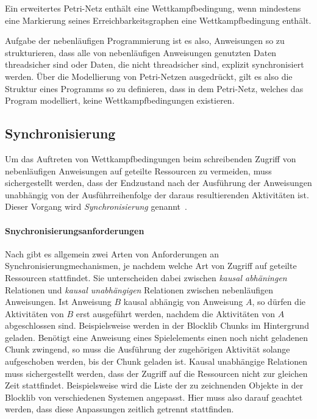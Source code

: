Ein erweitertes Petri-Netz enthält eine Wettkampfbedingung, wenn mindestens eine Markierung seines Erreichbarkeitsgraphen eine Wettkampfbedingung enthält.

Aufgabe der nebenläufigen Programmierung ist es also, Anweisungen so zu strukturieren, dass alle von nebenläufigen Anweisungen genutzten Daten threadsicher sind oder Daten, die nicht threadsicher sind, explizit synchronisiert werden. Über die Modellierung von Petri-Netzen ausgedrückt, gilt es also die Struktur eines Programms so zu definieren, dass in dem Petri-Netz, welches das Program modelliert, keine Wettkampfbedingungen existieren.

\subsection{Synchronisierung}
Um das Auftreten von Wettkampfbedingungen beim schreibenden Zugriff von nebenläufigen Anweisungen auf geteilte Ressourcen zu vermeiden, muss sichergestellt werden, dass der Endzustand nach der Ausführung der Anweisungen unabhängig von der Ausführreihenfolge der daraus resultierenden Aktivitäten ist. Dieser Vorgang wird \emph{Synchronisierung} genannt~\cite[S.~4]{Maurer2019}.

\paragraph{Snychronisierungsanforderungen} Nach \textcite[S.~132~ff.]{Herrtwich1989} gibt es allgemein zwei Arten von Anforderungen an Synchronisierungmechanismen, je nachdem welche Art von Zugriff auf geteilte Ressourcen stattfindet. Sie unterscheiden dabei zwischen \emph{kausal abhäningen} Relationen und \emph{kausal unabhängigen} Relationen zwischen nebenläufigen Anweisungen. Ist Anweisung $B$ kausal abhängig von Anweisung $A$, so dürfen die Aktivitäten von $B$ erst ausgeführt werden, nachdem die Aktivitäten von $A$ abgeschlossen sind. Beispielsweise werden in der Blocklib Chunks im Hintergrund geladen. Benötigt eine Anweisung eines Spielelements einen noch nicht geladenen Chunk zwingend, so muss die Ausführung der zugehörigen Aktivität solange aufgeschoben werden, bis der Chunk geladen ist. Kausal unabhängige Relationen muss sichergestellt werden, dass der Zugriff auf die Ressourcen nicht zur gleichen Zeit stattfindet.  Beispielsweise wird die Liste der zu zeichnenden Objekte in der Blocklib von verschiedenen Systemen angepasst. Hier muss also darauf geachtet werden, dass diese Anpassungen zeitlich getrennt stattfinden.

